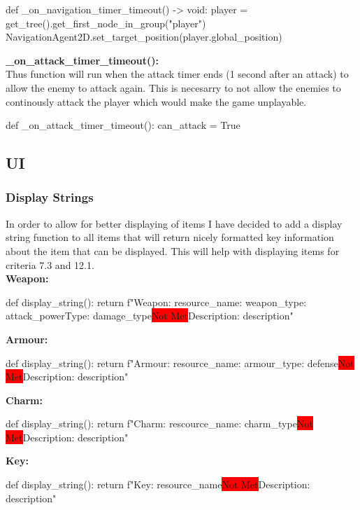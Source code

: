 \documentclass{article}
\newcommand{\red}[1]{\colorbox{red}{#1}}
\newcommand{\n}[0]{\red{Not Met}}
\begin{document}
        \begin{python}
def _on_navigation_timer_timeout() -> void:
   player = get_tree().get_first_node_in_group("player")
   NavigationAgent2D.set_target_position(player.global_position)
        \end{python}
        \textbf{\_on\_attack\_timer\_timeout():}\\
        Thus function will run when the attack timer ends (1 second after an attack) to allow the enemy to attack again. This is necesarry to not allow the enemies to continously attack the player which would make the game unplayable.\\
        \begin{python}
def _on_attack_timer_timeout():
   can_attack = True
        \end{python}
        \subsection{UI}
        \subsubsection{Display Strings}
        In order to allow for better displaying of items I have decided to add a display string function to all items that will return nicely formatted key information about the item that can be displayed. This will help with displaying items for criteria 7.3 and 12.1.\\
        \textbf{Weapon:}\\
        \begin{python}
def display_string():
   return f"Weapon\nName: {resource_name}\nType: {weapon_type}\nDamage: {attack_power}\nDamage Type: {damage_type}\n Description: {description}"
        \end{python}
        \textbf{Armour:}\\
        \begin{python}
def display_string():
   return f"Armour\nName: {resource_name}\nType: {armour_type}\nDefense: {defense}\n Description: {description}"
        \end{python}
        \textbf{Charm:}\\
        \begin{python}
def display_string():
   return f"Charm\nName: {rescource_name}\nType: {charm_type}\n Description: {description}"
        \end{python}
        \textbf{Key:}\\
        \begin{python}
def display_string():
   return f"Key\nName: {resource_name}\n Description: {description}"
        \end{python}
\end{document}
